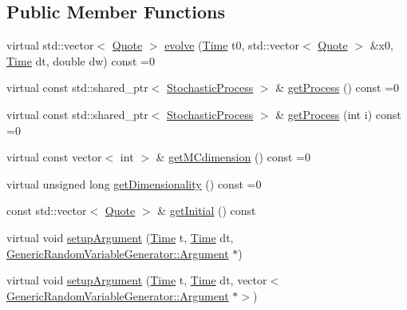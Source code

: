 \subsection*{Public Member Functions}
\begin{DoxyCompactItemize}
\item 
virtual std\+::vector$<$ \hyperlink{_name_def_8h_a642a6c5fd87319d922637de0e0bb0305}{Quote} $>$ \hyperlink{class_model_a087d56280bb51e8b04be3a9a30d06c76}{evolve} (\hyperlink{_name_def_8h_ac2d3e0ba793497bcca555c7c2cf64ff3}{Time} t0, std\+::vector$<$ \hyperlink{_name_def_8h_a642a6c5fd87319d922637de0e0bb0305}{Quote} $>$ \&x0, \hyperlink{_name_def_8h_ac2d3e0ba793497bcca555c7c2cf64ff3}{Time} dt, double dw) const =0
\item 
virtual const std\+::shared\+\_\+ptr$<$ \hyperlink{class_stochastic_process}{Stochastic\+Process} $>$ \& \hyperlink{class_model_adc6a695d3f6b2def79f2dde69b3ab547}{get\+Process} () const =0
\item 
virtual const std\+::shared\+\_\+ptr$<$ \hyperlink{class_stochastic_process}{Stochastic\+Process} $>$ \& \hyperlink{class_model_a23adaaf21b2955a1f4d4893ad9b77f02}{get\+Process} (int i) const =0
\item 
virtual const vector$<$ int $>$ \& \hyperlink{class_model_ac8a8c7e69b0be1df63ad141e0e14bf1e}{get\+M\+Cdimension} () const =0
\item 
virtual unsigned long \hyperlink{class_model_acbe41cf30367bce4b96e92812d644f2d}{get\+Dimensionality} () const =0
\item 
const std\+::vector$<$ \hyperlink{_name_def_8h_a642a6c5fd87319d922637de0e0bb0305}{Quote} $>$ \& \hyperlink{class_model_ade5d08aae4d32777bfa048f356bbcca9}{get\+Initial} () const
\item 
virtual void \hyperlink{class_model_ab75ee969956d763343ebe2e19f80735c}{setup\+Argument} (\hyperlink{_name_def_8h_ac2d3e0ba793497bcca555c7c2cf64ff3}{Time} t, \hyperlink{_name_def_8h_ac2d3e0ba793497bcca555c7c2cf64ff3}{Time} dt, \hyperlink{class_generic_random_variable_generator_1_1_argument}{Generic\+Random\+Variable\+Generator\+::\+Argument} $\ast$)
\item 
virtual void \hyperlink{class_model_a86fe5251e1a0c56097ba71f7d8c228d1}{setup\+Argument} (\hyperlink{_name_def_8h_ac2d3e0ba793497bcca555c7c2cf64ff3}{Time} t, \hyperlink{_name_def_8h_ac2d3e0ba793497bcca555c7c2cf64ff3}{Time} dt, vector$<$ \hyperlink{class_generic_random_variable_generator_1_1_argument}{Generic\+Random\+Variable\+Generator\+::\+Argument} $\ast$$>$)
\end{DoxyCompactItemize}

